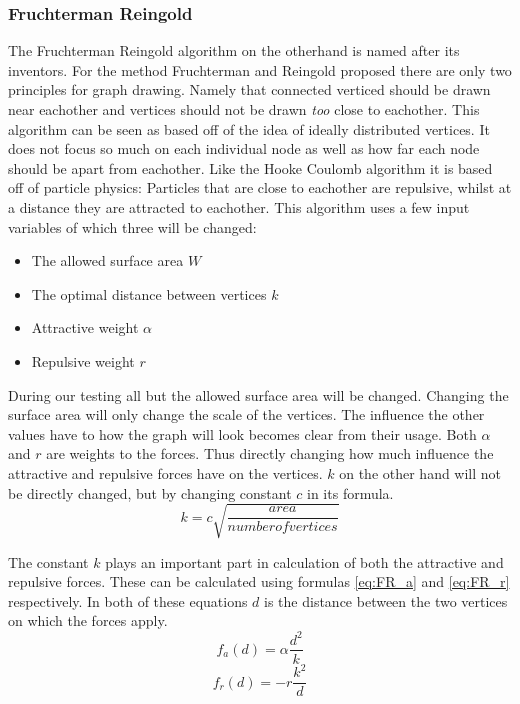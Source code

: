 \documentclass[a4paper,12pt]{article}
\begin{document}
    \subsubsection{Fruchterman Reingold}
    The Fruchterman Reingold algorithm on the otherhand is named after its inventors.\cite{fruchterman1991graph}
    For the method Fruchterman and Reingold proposed there are only two principles for graph drawing.
    Namely that connected verticed should be drawn near eachother and vertices should not be drawn \emph{too} close to eachother.
    This algorithm can be seen as based off of the idea of ideally distributed vertices.
    It does not focus so much on each individual node as well as how far each node should be apart from eachother.
    Like the Hooke Coulomb algorithm it is based off of particle physics:
    Particles that are close to eachother are repulsive, whilst at a distance they are attracted to eachother.
    This algorithm uses a few input variables of which three will be changed:
    \begin{itemize}
      \item The allowed surface area $W$
      \item The optimal distance between vertices $k$
      \item Attractive weight $\alpha$
      \item Repulsive weight $r$
    \end{itemize}
    During our testing all but the allowed surface area will be changed.
    Changing the surface area will only change the scale of the vertices.
    The influence the other values have to how the graph will look becomes clear from their usage.
    Both $\alpha$ and $r$ are weights to the forces.
    Thus directly changing how much influence the attractive and repulsive forces have on the vertices.
    $k$ on the other hand will not be directly changed, but by changing constant $c$ in its formula.
    \begin{equation}\label{eq:FR_k}
      k = c \sqrt{\frac{area}{number of vertices}}
    \end{equation}

    The constant $k$ plays an important part in calculation of both the attractive and repulsive forces.
    These can be calculated using formulas \ref{eq:FR_a} and \ref{eq:FR_r} respectively.
    In both of these equations $d$ is the distance between the two vertices on which the forces apply.
    \begin{equation}\label{eq:FR_a}
      f_a(d) = \alpha \frac{d^2}{k}
    \end{equation}
    \begin{equation}\label{eq:FR_r}
      f_r(d) = - r \frac{k^2}{d}
    \end{equation}
\end{document}
